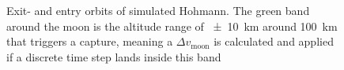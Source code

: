 \begin{figure}[ht!]
    \centering
        \caption{Exit- and entry orbits of simulated Hohmann. The green band around the moon is the altitude range of \SI{\pm 10}{\km} around \SI{100}{\km} that triggers a capture, meaning a $\Delta v_{\text{moon}}$ is calculated and applied if a discrete time step lands inside this band}
        \label{fig:hohmann-exit_entry}
\end{figure}

